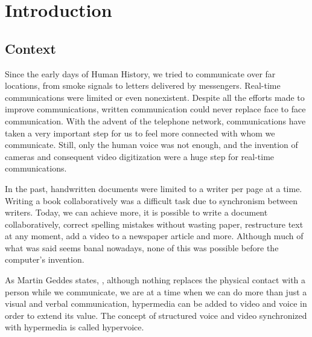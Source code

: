 \section{Introduction}

\subsection{Context}   %
Since the early days of Human History, we tried to communicate over far locations, from smoke signals to letters delivered by messengers. Real-time communications were limited or even nonexistent. Despite all the efforts made to improve communications, written communication could never replace face to face communication.
With the advent of the telephone network, communications have taken a very important step for us to feel more connected with whom we communicate. Still, only the human voice was not enough, and the invention of cameras and consequent video digitization were a huge step for real-time communications.

	In the past, handwritten documents were limited to a writer per page at a time. Writing a book collaboratively was a difficult task due to synchronism between writers.
	Today, we can achieve more, it is possible to write a document collaboratively, correct spelling mistakes without wasting paper, restructure text at any moment, add a video to a newspaper article and more. Although much of what was said seems banal nowadays, none of this was possible before the computer's invention. 

	As Martin Geddes states\cite{geddes},  , although nothing replaces the physical contact with a person while we communicate, we are at a time when we can do more than just a visual and verbal communication, hypermedia can be added to video and voice in order to extend its value. The concept of structured voice and video synchronized with hypermedia is called hypervoice\cite{geddes}.
        




